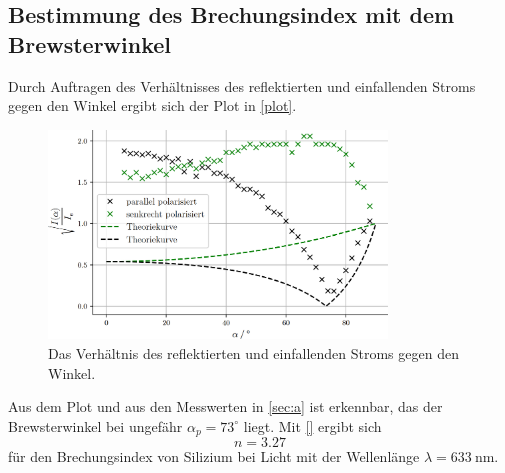 \subsection{Bestimmung des Brechungsindex mit dem Brewsterwinkel}
Durch Auftragen des Verhältnisses des reflektierten und einfallenden Stroms gegen den Winkel ergibt sich der Plot in \autoref{plot}.
\begin{figure}[H]
  \centering
  \includegraphics[width=9cm]{plot}
  \caption{Das Verhältnis des reflektierten und einfallenden Stroms gegen den Winkel.}
  \label{plot}
\end{figure}
Aus dem Plot und aus den Messwerten in \autoref{sec:a} ist erkennbar, das der Brewsterwinkel bei ungefähr $\alpha_p=73^\circ$ liegt. Mit \eqref{} ergibt sich 
\begin{equation*}
  n=3.27
\end{equation*}
für den Brechungsindex von Silizium bei Licht mit der Wellenlänge $\lambda=633\ \textrm{nm}$.

